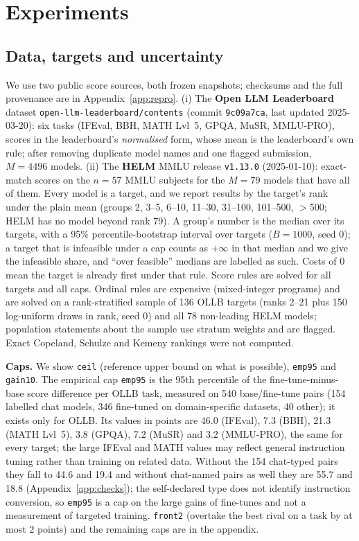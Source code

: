 \section{Experiments}
\label{sec:exp}

\subsection{Data, targets and uncertainty}
\label{sec:data}
We use two public score sources, both frozen snapshots; checksums and the full provenance are in Appendix~\ref{app:repro}. (i) The \textbf{Open LLM Leaderboard} dataset \texttt{open-llm-leaderboard/contents} (commit \texttt{9c09a7ca}, last updated 2025-03-20): six tasks (IFEval, BBH, MATH Lvl~5, GPQA, MuSR, MMLU-PRO), scores in the leaderboard's \emph{normalised} form, whose mean is the leaderboard's own rule; after removing duplicate model names and one flagged submission, $M=4496$ models. (ii) The \textbf{HELM} MMLU release \texttt{v1.13.0} (2025-01-10): exact-match scores on the $n=57$ MMLU subjects for the $M=79$ models that have all of them. Every model is a target, and we report results by the target's rank under the plain mean (groups 2, 3--5, 6--10, 11--30, 31--100, 101--500, $>$500; HELM has no model beyond rank 79). A group's number is the median over its targets, with a 95\% percentile-bootstrap interval over targets ($B=1000$, seed 0); a target that is infeasible under a cap counts as $+\infty$ in that median and we give the infeasible share, and ``over feasible'' medians are labelled as such. Costs of $0$ mean the target is already first under that rule. Score rules are solved for all targets and all caps. Ordinal rules are expensive (mixed-integer programs) and are solved on a rank-stratified sample of 136 OLLB targets (ranks 2--21 plus 150 log-uniform draws in rank, seed 0) and all 78 non-leading HELM models; population statements about the sample use stratum weights and are flagged. Exact Copeland, Schulze and Kemeny rankings were not computed.

\textbf{Caps.} We show \texttt{ceil} (reference upper bound on what is possible), \texttt{emp95} and \texttt{gain10}. The empirical cap \texttt{emp95} is the 95th percentile of the fine-tune-minus-base score difference per OLLB task, measured on 540 base/fine-tune pairs (154 labelled chat models, 346 fine-tuned on domain-specific datasets, 40 other); it exists only for OLLB. Its values in points are 46.0 (IFEval), 7.3 (BBH), 21.3 (MATH Lvl~5), 3.8 (GPQA), 7.2 (MuSR) and 3.2 (MMLU-PRO), the same for every target; the large IFEval and MATH values may reflect general instruction tuning rather than training on related data. Without the 154 chat-typed pairs they fall to 44.6 and 19.4 and without chat-named pairs as well they are 55.7 and 18.8 (Appendix~\ref{app:checks}); the self-declared type does not identify instruction conversion, so \texttt{emp95} is a cap on the large gains of fine-tunes and not a measurement of targeted training. \texttt{front2} (overtake the best rival on a task by at most 2 points) and the remaining caps are in the appendix.

